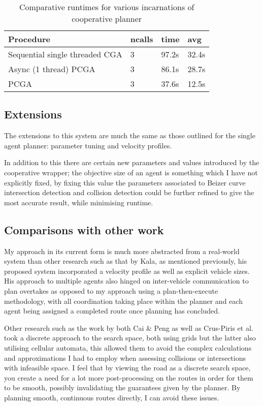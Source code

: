 \begin{table}
  \centering
  \begin{tabular}{|l l l l|}
    \hline
      Procedure &ncalls     &time   &avg\\
      \hline
      Sequential single threaded CGA       & 3    &97.2s  &32.4s\\
      Async (1 thread) PCGA                & 3    &86.1s  &28.7s\\
       PCGA           &3    &37.6s   &12.5s\\
      \hline
    \end{tabular}
    \caption{\label{tab:PCGA-speedup} Comparative runtimes for various incarnations of cooperative planner}
    \end{table}

\subsection{Extensions}

The extensions to this system are much the same as those outlined for the single agent planner: parameter tuning and velocity profiles.

In addition to this there are certain new parameters and values introduced by the cooperative wrapper; the objective size of an agent is something which I have not explicitly fixed, by fixing this value the parameters associated to Beizer curve intersection detection and collision detection could be further refined to give the most accurate result, while minimising runtime.

\subsection{Comparisons with other work}

My approach in its current form is much more abstracted from a real-world system than other research such as that by Kala, as mentioned previously, his proposed system incorporated a velocity profile as well as explicit vehicle sizes. His approach to multiple agents also hinged on inter-vehicle communication to plan overtakes as opposed to my approach using a plan-then-execute methodology, with all coordination taking place within the planner and each agent being assigned a completed route once planning has concluded.


Other research such as the work by both Cai \& Peng as well as Crus-Piris et al. took a discrete approach to the search space, both using grids but the latter also utilising cellular automata, this allowed them to avoid the complex calculations and approximations I had to employ when assessing collisions or intersections with infeasible space. I feel that by viewing the road as a discrete search space, you create a need for a lot more post-processing on the routes in order for them to be smooth, possibly invalidating the guarantees given by the planner. By planning smooth, continuous routes directly, I can avoid these issues.

